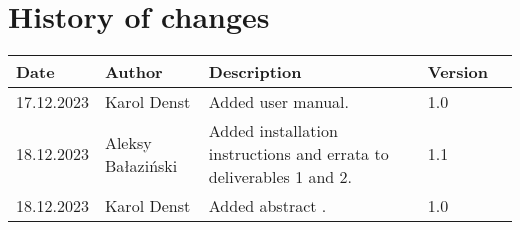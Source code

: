 \section{History of changes}
\begin{table}[H]
    \centering
    \begin{tabular}{lllll}
        \hline
        Date       & Author                                                                  & Description                          & Version & \\ \hline
        17.12.2023 & Karol Denst                                                             & Added user manual.                   & 1.0     & \\
        18.12.2023 & Aleksy Bałaziński                                                       & Added installation instructions and errata to deliverables 1 and 2.     & 1.1     & \\
        18.12.2023 & Karol Denst                                                             & Added abstract   .                   & 1.0     & \\
    \end{tabular}
\end{table}